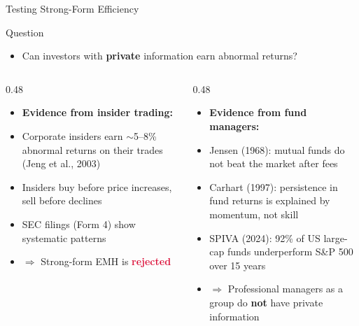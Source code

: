 \documentclass[9pt, aspectratio=169, t]{beamer}
\theoremstyle{definition}
\newenvironment{cminipage}[1]{%
    \par\noindent\hfill\begin{minipage}{#1}\ignorespaces
}{%
    \end{minipage}\hfill\null\par
}
\begin{document}
\begin{frame}{Testing Strong-Form Efficiency}
\begin{cminipage}{0.95\textwidth}
\begin{block}{Question}
\begin{itemize}\setlength{\itemsep}{0pt}
    \item Can investors with \textbf{private} information earn abnormal returns?
\end{itemize}
\end{block}

\begin{columns}[T]
\begin{column}{0.48\textwidth}
\begin{itemize}\setlength{\itemsep}{0pt}
    \item \textbf{Evidence from insider trading:}
    \item Corporate insiders earn $\sim$5--8\% abnormal returns on their trades (Jeng et al., 2003)
    \item Insiders buy before price increases, sell before declines
    \item SEC filings (Form 4) show systematic patterns
    \item $\Rightarrow$ Strong-form EMH is \textcolor{Crimson}{\textbf{rejected}}
\end{itemize}
\end{column}
\begin{column}{0.48\textwidth}
\begin{itemize}\setlength{\itemsep}{0pt}
    \item \textbf{Evidence from fund managers:}
    \item Jensen (1968): mutual funds do not beat the market after fees
    \item Carhart (1997): persistence in fund returns is explained by momentum, not skill
    \item SPIVA (2024): 92\% of US large-cap funds underperform S\&P 500 over 15 years
    \item $\Rightarrow$ Professional managers as a group do \textbf{not} have private information
\end{itemize}
\end{column}
\end{columns}
\end{cminipage}
\end{frame}
\end{document}
